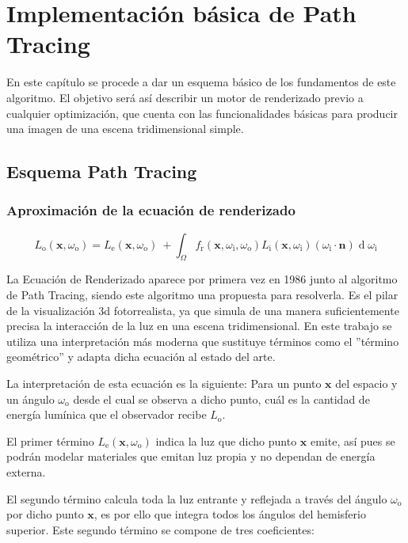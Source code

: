 \chapter{Implementación básica de Path Tracing}
	
En este capítulo se procede a dar un esquema básico de los fundamentos de este algoritmo. El objetivo será así describir un motor de renderizado previo a cualquier optimización, que cuenta con las funcionalidades básicas para producir una imagen de una escena tridimensional simple.


\section{Esquema Path Tracing}
\label{pathtracingexplanation}


	\subsection{Aproximación de la ecuación de renderizado}
\[
{\displaystyle L_{\text{o}}(\mathbf {x} ,\omega _{\text{o}})=L_{\text{e}}(\mathbf {x} ,\omega _{\text{o}})\ +\int _{\Omega }f_{\text{r}}(\mathbf {x} ,\omega _{\text{i}},\omega _{\text{o}})L_{\text{i}}(\mathbf {x} ,\omega _{\text{i}})(\omega _{\text{i}}\cdot \mathbf {n} )\operatorname {d} \omega _{\text{i}}}
\]

La Ecuación de Renderizado \cite{kajiya1986rendering} aparece por primera vez en 1986 junto al algoritmo de Path Tracing, siendo este algoritmo una propuesta para resolverla. Es el pilar de la visualización 3d fotorrealista, ya que simula de una manera suficientemente precisa la interacción de la luz en una escena tridimensional. En este trabajo se utiliza una interpretación más moderna que sustituye términos como el ''término geométrico'' y adapta dicha ecuación al estado del arte.

La interpretación de esta ecuación es la siguiente: Para un punto $\mathbf {x}$ del espacio y un ángulo $\omega _{\text{o}}$ desde el cual se observa a dicho punto, cuál es la cantidad de energía lumínica que el observador recibe $L_{\text{o}}$.

El primer término $L_{\text{e}}(\mathbf {x} ,\omega _{\text{o}})$ indica la luz que dicho punto $\mathbf {x}$ emite, así pues se podrán modelar materiales que emitan luz propia y no dependan de energía externa.

El segundo término calcula toda la luz entrante y reflejada a través del ángulo $\omega _{\text{o}}$ por dicho punto $\mathbf {x}$, es por ello que integra todos los ángulos del hemisferio superior. Este segundo término se compone de tres coeficientes:

